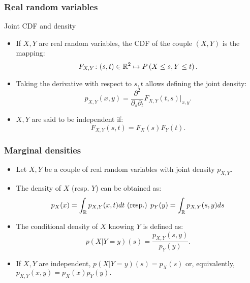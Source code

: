 \begin{frame}
    \frametitle{Real random variables}
\begin{block}{Joint CDF and density}
    \begin{itemize}
        \item<+-> If $X,Y$ are real random variables, the CDF of the couple $(X,Y)$ is the mapping:
        \begin{equation}
            F_{X,Y} \colon (s,t) \in \mathbb{R}^2 \mapsto P\left( X \leq s, Y \leq t \right).
        \end{equation}
        \item<+-> Taking the derivative with respect to $s,t$ allows defining the joint density:
        \begin{equation}
            p_{X,Y}(x,y)= \frac{\partial^2}{\partial_s \partial_t} F_{X,Y}(t,s) \vert_{x,y}.
        \end{equation}
        \item<+-> $X,Y$ are said to be independent if:
        \begin{equation}
            F_{X,Y}(s,t) = F_X(s) F_Y(t). 
        \end{equation}
    \end{itemize}
\end{block}
\end{frame}
\begin{frame}
    \frametitle{Marginal densities}
   \begin{itemize}
    \item<+-> Let $X,Y$ be a couple of real random variables with joint density $p_{X,Y}.$
    \item<+-> The density of $X$ (resp. $Y$) can be obtained as:
    \begin{equation}
        p_X(x) = \int_{\mathbb{R}} p_{X,Y}(x,t) dt \text{ (resp.) } p_Y(y) = \int_{\mathbb{R}} p_{X,Y}(s,y) ds
    \end{equation}
    \item<+-> The conditional density of $X$ knowing $Y$ is defined as:
    \begin{equation}
        p\left(X\vert Y=y\right)(s) = \frac{p_{X,Y}(s,y)}{p_Y(y)}.
    \end{equation}
    \item<+-> If $X,Y$ are independent, $p(X \vert Y=y)(s) = p_X(s)$ or, equivalently,
    $p_{X,Y}(x,y)=p_X(x)p_Y(y).$
   \end{itemize} 
\end{frame}
